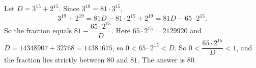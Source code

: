 Let $D=3^{15}+2^{15}$. Since $3^{19}=81\cdot3^{15}$,
\[
3^{19}+2^{19}=81D-81\cdot2^{15}+2^{19}=81D-65\cdot2^{15}.
\]
So the fraction equals $81-\dfrac{65\cdot2^{15}}{D}$. Here $65\cdot2^{15}=2129920$ and $D=14348907+32768=14381675$, so $0<65\cdot2^{15}<D$. So $0<\dfrac{65\cdot2^{15}}{D}<1$, and the fraction lies strictly between $80$ and $81$. The answer is $\boxed{80}$.
